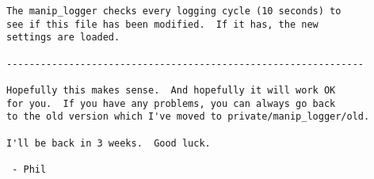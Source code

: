 \begin{verbatim}
The manip_logger checks every logging cycle (10 seconds) to
see if this file has been modified.  If it has, the new
settings are loaded.

---------------------------------------------------------------

Hopefully this makes sense.  And hopefully it will work OK
for you.  If you have any problems, you can always go back
to the old version which I've moved to private/manip_logger/old.

I'll be back in 3 weeks.  Good luck.

 - Phil


\end{verbatim}




